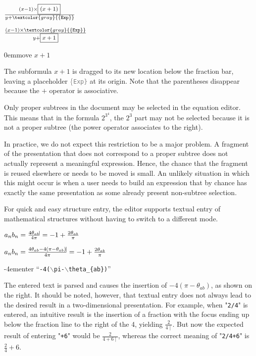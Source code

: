 \documentclass{entcs}
\begin{document}
\editStepScrshot
{$ \frac{(x-1)\times{ \framebox{\scriptsize $(x+1)$}}}{y + \textcolor{gray}{\{\tt Exp\}}}    $}
{\begin{normalsize}$ \frac{(x-1)\times{\textcolor{gray}{\{\tt Exp\}}} }{y + \framebox{\scriptsize $x+1$}}{\vrule height1.8ex width-2.5pt depth1.99ex} $ \end{normalsize}}
{0em}{\small move $x+1$}

The subformula $x+1$ is dragged to its new location below the fraction bar, leaving a placeholder \textcolor{gray}{\{\tt Exp\}} at its origin. Note that the parentheses disappear because the $+$ operator is associative. 

Only proper subtrees in the document may be selected in the equation editor. This means that in the formula $2^{3^4}$, 
the $2^3$ part may not be selected because it is not a proper subtree (the power operator associates to the right). 

In practice, we do not expect this restriction to be a major problem. A fragment of the presentation that does not correspond to a proper subtree does not actually represent a meaningful expression. Hence, the chance that the fragment is reused elsewhere or needs to be moved is small. An unlikely situation in which this might occur is when a user needs to build an expression that by chance has exactly the same presentation as some already present non-subtree selection.


For quick and easy structure entry, the editor supports textual entry of mathematical structures without having to switch to a different mode.


\editStepScrshot
{\begin{normalsize}$a_nb_n = \frac{4\theta_{ab}\vline}{4\pi } = -1 + \frac{2\theta_{ab}}{\pi}$ \end{normalsize}}
{\begin{normalsize}$a_nb_n = \frac{4\theta_{ab} - 4(\pi - \theta_{ab})\vline}{4\pi } = -1 + \frac{2\theta_{ab}}{\pi}$ \end{normalsize}}
{-4em}{\small enter  ``{\tt -4($\backslash$pi-$\backslash$theta\_\{ab\})}'' }



The entered text is parsed and causes the insertion of $- 4(\pi - \theta_{ab})$, as shown on the right.  It should be noted, however, that textual entry does not always lead to the desired result in a two-dimensional presentation. For example, when "\verb|2/4|" is entered, an intuitive result is the insertion of a fraction with the focus ending up below the fraction line to the right of the 4, yielding {$\frac{2}{4\mid}$}. But now the expected result of entering "\verb|+6|" would be {$\frac{2}{4+6\mid}$}, whereas the correct meaning of "\verb|2/4+6|" is $\frac{2}{4}+6$.
\end{document}
